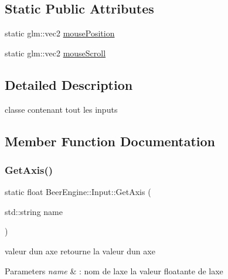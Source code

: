 \subsection*{Static Public Attributes}
\begin{DoxyCompactItemize}
\item 
static glm\+::vec2 \mbox{\hyperlink{class_beer_engine_1_1_input_ae232daf7243afe948422d0b3bb14d2d2}{mouse\+Position}}
\item 
static glm\+::vec2 \mbox{\hyperlink{class_beer_engine_1_1_input_aaba670f7f093d65462f47cb46f8810bc}{mouse\+Scroll}}
\end{DoxyCompactItemize}


\subsection{Detailed Description}
classe contenant tout les inputs 

\subsection{Member Function Documentation}
\mbox{\label{class_beer_engine_1_1_input_ac21c03c4b7d417941034e935af481f2c}} 
\subsubsection{\texorpdfstring{Get\+Axis()}{GetAxis()}}
{\footnotesize\ttfamily static float Beer\+Engine\+::\+Input\+::\+Get\+Axis (\begin{DoxyParamCaption}\item[{std\+::string}]{name }\end{DoxyParamCaption})\hspace{0.3cm}{\ttfamily [static]}}



valeur d\textquotesingle{}un axe retourne la valeur d\textquotesingle{}un axe 


\begin{DoxyParams}{Parameters}
{\em name} & \+: nom de l\textquotesingle{}axe  la valeur floatante de l\textquotesingle{}axe \\
\hline
\end{DoxyParams}
\mbox{\label{class_beer_engine_1_1_input_aef391d62eeafff68a8b33d232e38c324}} 
